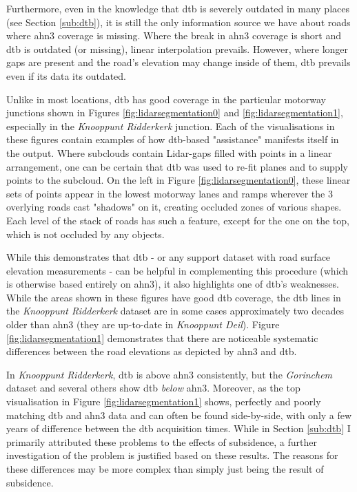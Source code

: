 Furthermore, even in the knowledge that \ac{dtb} is severely outdated in many places (see Section \ref{sub:dtb}), it is still the only information source we have about roads where \ac{ahn3} coverage is missing. Where the break in \ac{ahn3} coverage is short and \ac{dtb} is outdated (or missing), linear interpolation prevails. However, where longer gaps are present and the road's elevation may change inside of them, \ac{dtb} prevails even if its data its outdated.

Unlike in most locations, \ac{dtb} has good coverage in the particular motorway junctions shown in Figures \ref{fig:lidarsegmentation0} and \ref{fig:lidarsegmentation1}, especially in the \textit{Knooppunt Ridderkerk} junction. Each of the visualisations in these figures contain examples of how \ac{dtb}-based "assistance" manifests itself in the output. Where subclouds contain Lidar-gaps filled with points in a linear arrangement, one can be certain that \ac{dtb} was used to re-fit planes and to supply points to the subcloud. On the left in Figure \ref{fig:lidarsegmentation0}, these linear sets of points appear in the lowest motorway lanes and ramps wherever the 3 overlying roads cast "shadows" on it, creating occluded zones of various shapes. Each level of the stack of roads has such a feature, except for the one on the top, which is not occluded by any objects.

While this demonstrates that \ac{dtb} - or any support dataset with road surface elevation measurements - can be helpful in complementing this procedure (which is otherwise based entirely on \ac{ahn3}), it also highlights one of \ac{dtb}'s weaknesses. While the areas shown in these figures have good \ac{dtb} coverage, the \ac{dtb} lines in the \textit{Knooppunt Ridderkerk} dataset are in some cases approximately two decades older than \ac{ahn3} (they are up-to-date in \textit{Knooppunt Deil}). Figure \ref{fig:lidarsegmentation1} demonstrates that there are noticeable systematic differences between the road elevations as depicted by \ac{ahn3} and \ac{dtb}.

In \textit{Knooppunt Ridderkerk}, \ac{dtb} is above \ac{ahn3} consistently, but the \textit{Gorinchem} dataset and several others show \ac{dtb} \textit{below} \ac{ahn3}. Moreover, as the top visualisation in Figure \ref{fig:lidarsegmentation1} shows, perfectly and poorly matching \ac{dtb} and \ac{ahn3} data and can often be found side-by-side, with only a few years of difference between the \ac{dtb} acquisition times. While in Section \ref{sub:dtb} I primarily attributed these problems to the effects of subsidence, a further investigation of the problem is justified based on these results. The reasons for these differences may be more complex than simply just being the result of subsidence.


